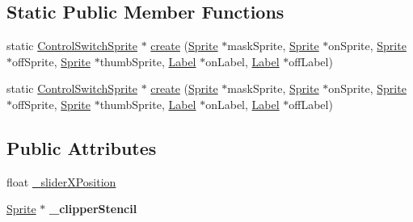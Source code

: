\subsection*{Static Public Member Functions}
\begin{DoxyCompactItemize}
\item 
static \hyperlink{classControlSwitchSprite}{Control\+Switch\+Sprite} $\ast$ \hyperlink{classControlSwitchSprite_a6acad0c53ee5f91dd2cf51fb2754dd92}{create} (\hyperlink{classSprite}{Sprite} $\ast$mask\+Sprite, \hyperlink{classSprite}{Sprite} $\ast$on\+Sprite, \hyperlink{classSprite}{Sprite} $\ast$off\+Sprite, \hyperlink{classSprite}{Sprite} $\ast$thumb\+Sprite, \hyperlink{classLabel}{Label} $\ast$on\+Label, \hyperlink{classLabel}{Label} $\ast$off\+Label)
\item 
static \hyperlink{classControlSwitchSprite}{Control\+Switch\+Sprite} $\ast$ \hyperlink{classControlSwitchSprite_a1509090ace452e9b761a07294fa22a3e}{create} (\hyperlink{classSprite}{Sprite} $\ast$mask\+Sprite, \hyperlink{classSprite}{Sprite} $\ast$on\+Sprite, \hyperlink{classSprite}{Sprite} $\ast$off\+Sprite, \hyperlink{classSprite}{Sprite} $\ast$thumb\+Sprite, \hyperlink{classLabel}{Label} $\ast$on\+Label, \hyperlink{classLabel}{Label} $\ast$off\+Label)
\end{DoxyCompactItemize}
\subsection*{Public Attributes}
\begin{DoxyCompactItemize}
\item 
float \hyperlink{classControlSwitchSprite_a27b95d1b88b45a062848f0fa0101da58}{\+\_\+slider\+X\+Position}
\item 
\mbox{\label{classControlSwitchSprite_a2de3004d626100a5d445317e30b9da52}} 
\hyperlink{classSprite}{Sprite} $\ast$ {\bfseries \+\_\+clipper\+Stencil}
\end{DoxyCompactItemize}
